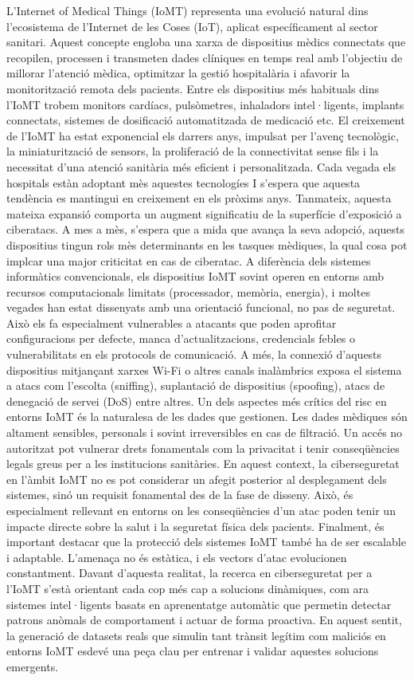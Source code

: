  L’Internet of Medical Things (IoMT) representa una evolució natural dins l’ecosistema de l’Internet de les Coses (IoT), aplicat específicament al sector sanitari. Aquest concepte engloba una xarxa de dispositius mèdics connectats que recopilen, processen i transmeten dades clíniques en temps real amb l’objectiu de millorar l’atenció mèdica, optimitzar la gestió hospitalària i afavorir la monitorització remota dels pacients. Entre els dispositius més habituals dins l’IoMT trobem monitors cardíacs, pulsòmetres, inhaladors intel·ligents, implants connectats, sistemes de dosificació automatitzada de medicació etc.
  El creixement de l’IoMT ha estat exponencial els darrers anys, impulsat per l’avenç tecnològic, la miniaturització de sensors, la proliferació de la connectivitat sense fils i la necessitat d’una atenció sanitària més eficient i personalitzada. Cada vegada els hospitals estàn adoptant mès aquestes tecnologíes I s’espera que aquesta tendència es mantingui en creixement en els pròxims anys. Tanmateix, aquesta mateixa expansió comporta un augment significatiu de la superfície d’exposició a ciberatacs. A mes a mès, s’espera que a mida que avança la seva adopció, aquests dispositius tingun rols mès determinants en les tasques mèdiques, la qual cosa pot implcar una major criticitat en cas de ciberatac. 
  A diferència dels sistemes informàtics convencionals, els dispositius IoMT sovint operen en entorns amb recursos computacionals limitats (processador, memòria, energia), i moltes vegades han estat dissenyats amb una orientació funcional, no pas de seguretat. Això els fa especialment vulnerables a atacants que poden aprofitar configuracions per defecte, manca d’actualitzacions, credencials febles o vulnerabilitats en els protocols de comunicació. A més, la connexió d’aquests dispositius mitjançant xarxes Wi-Fi o altres canals inalàmbrics exposa el sistema a atacs com l’escolta (sniffing), suplantació de dispositius (spoofing), atacs de denegació de servei (DoS) entre altres. 
  Un dels aspectes més crítics del risc en entorns IoMT és la naturalesa de les dades que gestionen. Les dades mèdiques són altament sensibles, personals i sovint irreversibles en cas de filtració. Un accés no autoritzat pot vulnerar drets fonamentals com la privacitat i tenir conseqüències legals greus per a les institucions sanitàries. 
  En aquest context, la ciberseguretat en l’àmbit IoMT no es pot considerar un afegit posterior al desplegament dels sistemes, sinó un requisit fonamental des de la fase de disseny. Això, és especialment rellevant en entorns on les conseqüències d’un atac poden tenir un impacte directe sobre la salut i la seguretat física dels pacients.
  Finalment, és important destacar que la protecció dels sistemes IoMT també ha de ser escalable i adaptable. L’amenaça no és estàtica, i els vectors d’atac evolucionen constantment. Davant d’aquesta realitat, la recerca en ciberseguretat per a l’IoMT s’està orientant cada cop més cap a solucions dinàmiques, com ara sistemes intel·ligents basats en aprenentatge automàtic que permetin detectar patrons anòmals de comportament i actuar de forma proactiva. En aquest sentit, la generació de datasets reals que simulin tant trànsit legítim com maliciós en entorns IoMT esdevé una peça clau per entrenar i validar aquestes solucions emergents.


